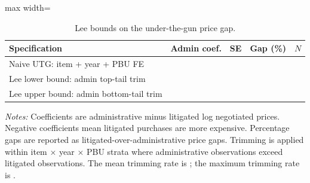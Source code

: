 \begin{table}[ht]
\centering
\caption{Lee bounds on the under-the-gun price gap.}
\label{tab:utg_lee_bounds}
\begin{threeparttable}
\small
\setlength{\tabcolsep}{4pt}
\begin{adjustbox}{max width=\textwidth}
\begin{tabular}{p{.38\linewidth}rrrr}
\toprule
Specification & Admin coef. & SE & Gap (\%) & $N$ \\
\midrule
Naive UTG: item + year + PBU FE & \BPutgPointNaiveCoef{} & \BPutgPointNaiveSE{} & \BPutgPointNaive{} & \BPutgPointNaiveN{} \\
Lee lower bound: admin top-tail trim & \BPutgBoundLowCoef{} & \BPutgBoundLowSE{} & \BPutgBoundLow{} & \BPutgBoundLowN{} \\
Lee upper bound: admin bottom-tail trim & \BPutgBoundHighCoef{} & \BPutgBoundHighSE{} & \BPutgBoundHigh{} & \BPutgBoundHighN{} \\
\bottomrule
\end{tabular}
\end{adjustbox}
\begin{tablenotes}[flushleft]\footnotesize
\item \textit{Notes:} Coefficients are administrative minus litigated log negotiated prices. Negative coefficients mean litigated purchases are more expensive. Percentage gaps are reported as litigated-over-administrative price gaps. Trimming is applied within item $\times$ year $\times$ PBU strata where administrative observations exceed litigated observations. The mean trimming rate is \BPutgLeeTrimMean{}; the maximum trimming rate is \BPutgLeeTrimMax{}.
\end{tablenotes}
\end{threeparttable}
\end{table}
